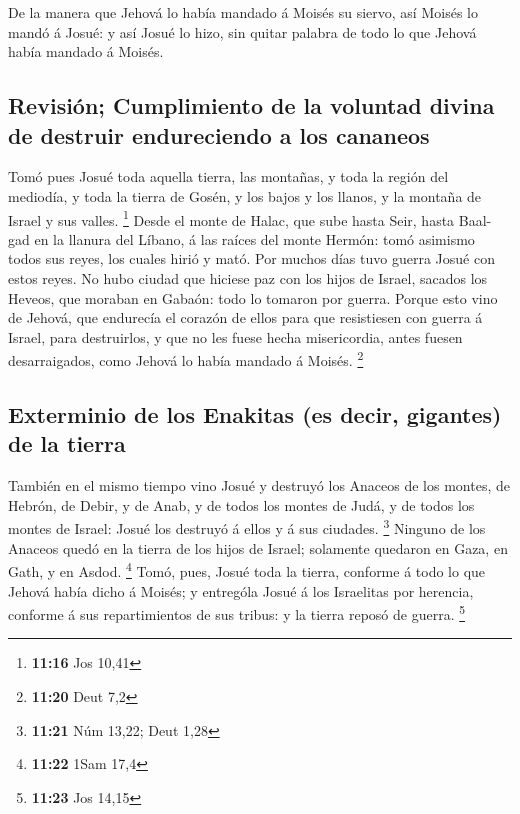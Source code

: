  De la manera que Jehová lo había mandado á Moisés su
siervo, así Moisés lo mandó á Josué: y así Josué lo hizo, sin quitar
palabra de todo lo que Jehová había mandado á Moisés.

\hypertarget{revisiuxf3n-cumplimiento-de-la-voluntad-divina-de-destruir-endureciendo-a-los-cananeos}{%
\subsection{Revisión; Cumplimiento de la voluntad divina de destruir
endureciendo a los
cananeos}\label{revisiuxf3n-cumplimiento-de-la-voluntad-divina-de-destruir-endureciendo-a-los-cananeos}}

 Tomó pues Josué toda aquella tierra, las montañas, y
toda la región del mediodía, y toda la tierra de Gosén, y los bajos y
los llanos, y la montaña de Israel y sus valles. \footnote{\textbf{11:16}
  Jos 10,41}  Desde el monte de Halac, que sube hasta
Seir, hasta Baal-gad en la llanura del Líbano, á las raíces del monte
Hermón: tomó asimismo todos sus reyes, los cuales hirió y mató.
 Por muchos días tuvo guerra Josué con estos reyes.
 No hubo ciudad que hiciese paz con los hijos de Israel,
sacados los Heveos, que moraban en Gabaón: todo lo tomaron por guerra.
 Porque esto vino de Jehová, que endurecía el corazón de
ellos para que resistiesen con guerra á Israel, para destruirlos, y que
no les fuese hecha misericordia, antes fuesen desarraigados, como Jehová
lo había mandado á Moisés. \footnote{\textbf{11:20} Deut 7,2}

\hypertarget{exterminio-de-los-enakitas-es-decir-gigantes-de-la-tierra}{%
\subsection{Exterminio de los Enakitas (es decir, gigantes) de la
tierra}\label{exterminio-de-los-enakitas-es-decir-gigantes-de-la-tierra}}

 También en el mismo tiempo vino Josué y destruyó los
Anaceos de los montes, de Hebrón, de Debir, y de Anab, y de todos los
montes de Judá, y de todos los montes de Israel: Josué los destruyó á
ellos y á sus ciudades. \footnote{\textbf{11:21} Núm 13,22; Deut 1,28}
 Ninguno de los Anaceos quedó en la tierra de los hijos
de Israel; solamente quedaron en Gaza, en Gath, y en Asdod. \footnote{\textbf{11:22}
  1Sam 17,4}  Tomó, pues, Josué toda la tierra, conforme
á todo lo que Jehová había dicho á Moisés; y entrególa Josué á los
Israelitas por herencia, conforme á sus repartimientos de sus tribus: y
la tierra reposó de guerra. \footnote{\textbf{11:23} Jos 14,15}

